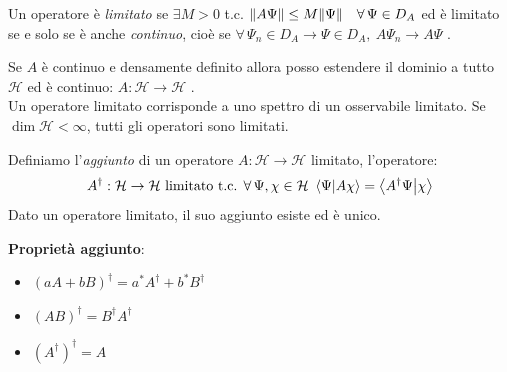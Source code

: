 \begin{definition}
    Un operatore è \textit{limitato} se \(\exists M >0 \) t.c. \(\norm{A\Psi} \leq M \norm{\Psi}\quad \forall\, \Psi \in D_A\)
    ed è limitato se e solo se è anche \textit{continuo}, cioè se \(\forall\, \Psi_n \in D_A\to \Psi \in D_A, \ A\Psi_n \to A \Psi\) .
\end{definition}

Se \(A\) è continuo e densamente definito allora posso estendere il dominio a tutto \(\mathcal{H}\) ed è continuo: \(A : \mathcal{H}\to \mathcal{H}\) . \\
Un operatore limitato corrisponde a uno spettro di un osservabile limitato.
Se \(\operatorname{dim}\mathcal{H} < \infty\), tutti gli operatori sono limitati. 

\begin{definition}
    Definiamo l'\textit{aggiunto} di un operatore \(A: \mathcal{H}\to \mathcal{H}\) limitato, l'operatore:
    \begin{equation}
        A^\dagger: \mathcal{H}\to \mathcal{H} \text{ limitato t.c. } 
        \forall \,\Psi, \chi \in \mathcal{H}\ \braket{\Psi}{A\chi} = \braket{A^\dagger\Psi}{\chi}
    \end{equation}
    Dato un operatore limitato, il suo aggiunto esiste ed è unico.
\end{definition}

\textbf{Proprietà aggiunto}:
\begin{itemize}
    \item \((aA+ bB)^\dagger= a^*A^\dagger + b^*B^\dagger \)
    \item \((AB)^\dagger= B^\dagger A^\dagger\)
    \item \((A^\dagger)^\dagger= A\) 
\end{itemize}


